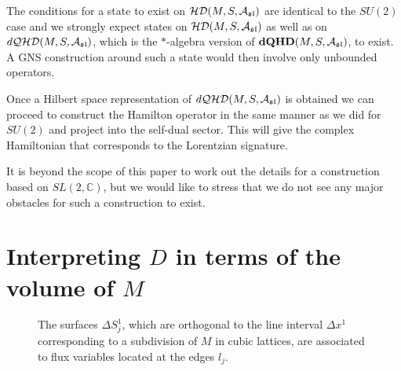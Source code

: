 \documentclass[12pt]{article}
\def\ca{{\cal A}}
\def\cd{{\cal D}}
\def\ch{{\cal H}}
\def\cq{{\cal Q}}
\begin{document}
The conditions for a state to exist on $\ch\cd(M,S,\ca_{\tiny \mathfrak{sl}})$ are identical to the $SU(2)$ case and we strongly expect states on $\ch\cd(M,S,\ca_{\tiny \mathfrak{sl}})$ as well as on $d\cq\ch\cd(M,S,\ca_{\tiny \mathfrak{sl}})$, which is the $*$-algebra version of $\mathbf{dQHD}(M,S,\ca_{\tiny \mathfrak{sl}})$, to exist. A GNS construction around such a state would then involve only unbounded operators.


Once a Hilbert space representation of $d\cq\ch\cd(M,S,\ca_{\tiny \mathfrak{sl}})$ is obtained we can proceed to construct the Hamilton operator in the same manner as we did for $SU(2)$ and project into the self-dual sector. This will give the complex Hamiltonian that corresponds to the Lorentzian signature.

It is beyond the scope of this paper to work out the details for a construction based on $SL(2,\mathbb{C})$, but we would like to stress that we do not see any major obstacles for such a construction to exist.%







\section{Interpreting $D$ in terms of the volume of $M$}



\begin{figure}[t]
\begin{center}
\resizebox{!}{4.2cm}{
 }
\end{center}
\caption{The surfaces $\Delta S^1_j$, which are orthogonal to the line interval $\Delta x^1$ corresponding to a subdivision of $M$ in cubic lattices, are associated to flux variables located at the edges $l_j$.}
\label{leninnnn}
\end{figure}
\end{document}
